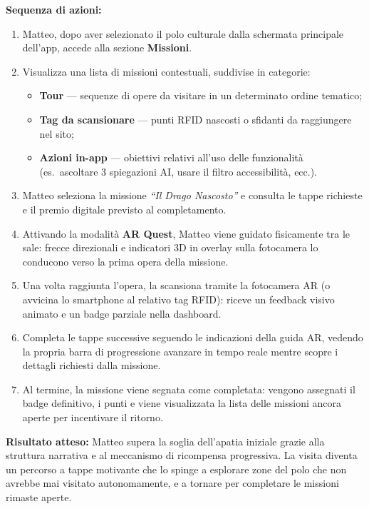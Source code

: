 \vspace{0.3cm}
\noindent\textbf{\color{culturiaRed}Sequenza di azioni:}
\begin{enumerate}[nosep, leftmargin=1.4em]
  \item Matteo, dopo aver selezionato il polo culturale dalla schermata principale dell'app, accede alla sezione \textbf{Missioni}.
  \item Visualizza una lista di missioni contestuali, suddivise in categorie:
    \begin{itemize}[nosep, leftmargin=1.6em]
      \item \textbf{Tour} — sequenze di opere da visitare in un determinato ordine tematico;
      \item \textbf{Tag da scansionare} — punti RFID nascosti o sfidanti da raggiungere nel sito;
      \item \textbf{Azioni in-app} — obiettivi relativi all'uso delle funzionalità (es.\ ascoltare 3 spiegazioni AI, usare il filtro accessibilità, ecc.).
    \end{itemize}
  \item Matteo seleziona la missione \textit{``Il Drago Nascosto''} e consulta le tappe richieste e il premio digitale previsto al completamento.
  \item Attivando la modalità \textbf{AR Quest}, Matteo viene guidato fisicamente tra le sale: frecce direzionali e indicatori 3D in overlay sulla fotocamera lo conducono verso la prima opera della missione.
  \item Una volta raggiunta l'opera, la scansiona tramite la fotocamera AR (o avvicina lo smartphone al relativo tag RFID): riceve un feedback visivo animato e un badge parziale nella dashboard.
  \item Completa le tappe successive seguendo le indicazioni della guida AR, vedendo la propria barra di progressione avanzare in tempo reale mentre scopre i dettagli richiesti dalla missione.
  \item Al termine, la missione viene segnata come completata: vengono assegnati il badge definitivo, i punti e viene visualizzata la lista delle missioni ancora aperte per incentivare il ritorno.
\end{enumerate}

\vspace{0.15cm}
\noindent\textbf{\color{culturiaRed}Risultato atteso:}
Matteo supera la soglia dell'apatia iniziale grazie alla struttura narrativa e al meccanismo di ricompensa progressiva. La visita diventa un percorso a tappe motivante che lo spinge a esplorare zone del polo che non avrebbe mai visitato autonomamente, e a tornare per completare le missioni rimaste aperte.

